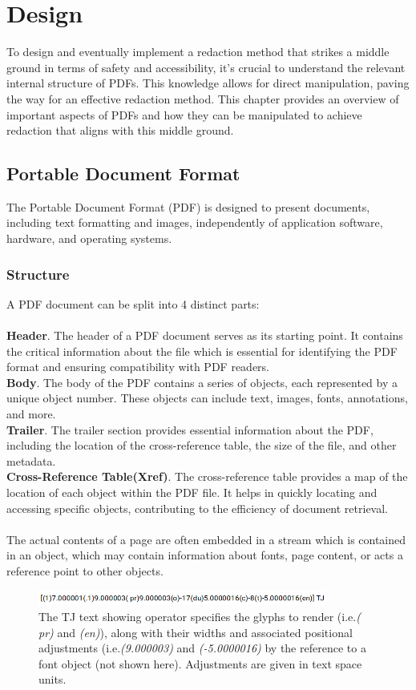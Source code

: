 \chapter{Design}
To design and eventually implement a redaction method that strikes a middle ground in terms of safety and accessibility, it's crucial to understand the relevant internal structure of PDFs. This knowledge allows for direct manipulation, paving the way for an effective redaction method. This chapter provides an overview of important aspects of PDFs and how they can be manipulated to achieve redaction that aligns with this middle ground.

\section{Portable Document Format}
The Portable Document Format (PDF) is designed to present documents, including text formatting and images, independently of application software, hardware, and operating systems.
\subsection{Structure}
A PDF document can be split into 4 distinct parts: 
\\\\
\textbf{Header}. The header of a PDF document serves as its starting point. It contains the critical information about the file which is essential for identifying the PDF format and ensuring compatibility with PDF readers. \\
\textbf{Body}. The body of the PDF contains a series of objects, each represented by a unique object number. These objects can include text, images, fonts, annotations, and more.\\
\textbf{Trailer}. The trailer section provides essential information about the PDF, including the location of the cross-reference table, the size of the file, and other metadata. \\
\textbf{Cross-Reference Table(Xref)}. The cross-reference table provides a map of the location of each object within the PDF file. It helps in quickly locating and accessing specific objects, contributing to the efficiency of document retrieval.
\\\\
The actual contents of a page are often embedded in a stream which is contained in an object, which may contain information about fonts, page content, or acts a reference point to other objects.  
\begin{figure}[h]
\includegraphics[width=0.85\textwidth]{latex/media/TJexample.png}
\centering
\caption{The TJ text showing operator specifies the glyphs to render (i.e.\textit{( pr)} and \textit{(en)}), along with their widths and associated positional adjustments (i.e.\textit{(9.000003)} and \textit{(-5.0000016)} by the reference to a font object (not shown here). Adjustments are given in text space units. }
\label{fig:tjexample}
\end{figure}
